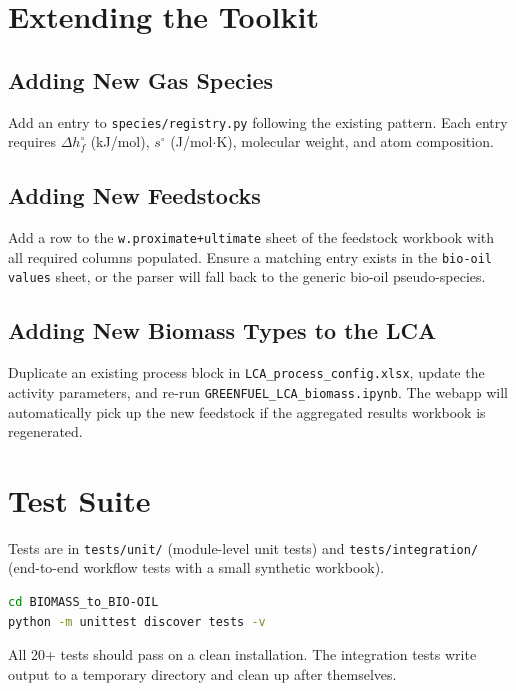 \documentclass[12pt, a4paper]{article}
\begin{document}
\section{Extending the Toolkit}

\subsection{Adding New Gas Species}

Add an entry to \texttt{species/registry.py} following the existing pattern. Each entry requires $\Delta h_f^\circ$ (kJ/mol), $s^\circ$ (J/mol$\cdot$K), molecular weight, and atom composition.

\subsection{Adding New Feedstocks}

Add a row to the \texttt{w.proximate+ultimate} sheet of the feedstock workbook with all required columns populated. Ensure a matching entry exists in the \texttt{bio-oil values} sheet, or the parser will fall back to the generic bio-oil pseudo-species.

\subsection{Adding New Biomass Types to the LCA}

Duplicate an existing process block in \texttt{LCA\_process\_config.xlsx}, update the activity parameters, and re-run \texttt{GREENFUEL\_LCA\_biomass.ipynb}. The webapp will automatically pick up the new feedstock if the aggregated results workbook is regenerated.

\section{Test Suite}

Tests are in \texttt{tests/unit/} (module-level unit tests) and \texttt{tests/integration/} (end-to-end workflow tests with a small synthetic workbook).

\begin{lstlisting}[language=bash]
cd BIOMASS_to_BIO-OIL
python -m unittest discover tests -v
\end{lstlisting}

All 20+ tests should pass on a clean installation. The integration tests write output to a temporary directory and clean up after themselves.
\end{document}
